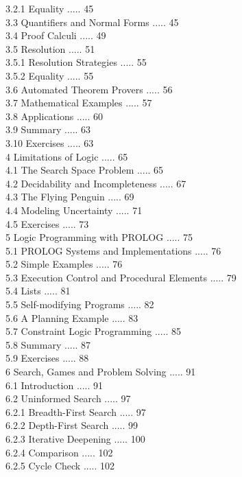 \documentclass[10pt]{book}
\begin{document}
3.2.1 Equality ..... 45\\
3.3 Quantifiers and Normal Forms ..... 45\\
3.4 Proof Calculi ..... 49\\
3.5 Resolution ..... 51\\
3.5.1 Resolution Strategies ..... 55\\
3.5.2 Equality ..... 55\\
3.6 Automated Theorem Provers ..... 56\\
3.7 Mathematical Examples ..... 57\\
3.8 Applications ..... 60\\
3.9 Summary ..... 63\\
3.10 Exercises ..... 63\\
4 Limitations of Logic ..... 65\\
4.1 The Search Space Problem ..... 65\\
4.2 Decidability and Incompleteness ..... 67\\
4.3 The Flying Penguin ..... 69\\
4.4 Modeling Uncertainty ..... 71\\
4.5 Exercises ..... 73\\
5 Logic Programming with PROLOG ..... 75\\
5.1 PROLOG Systems and Implementations ..... 76\\
5.2 Simple Examples ..... 76\\
5.3 Execution Control and Procedural Elements ..... 79\\
5.4 Lists ..... 81\\
5.5 Self-modifying Programs ..... 82\\
5.6 A Planning Example ..... 83\\
5.7 Constraint Logic Programming ..... 85\\
5.8 Summary ..... 87\\
5.9 Exercises ..... 88\\
6 Search, Games and Problem Solving ..... 91\\
6.1 Introduction ..... 91\\
6.2 Uninformed Search ..... 97\\
6.2.1 Breadth-First Search ..... 97\\
6.2.2 Depth-First Search ..... 99\\
6.2.3 Iterative Deepening ..... 100\\
6.2.4 Comparison ..... 102\\
6.2.5 Cycle Check ..... 102\\
\end{document}

